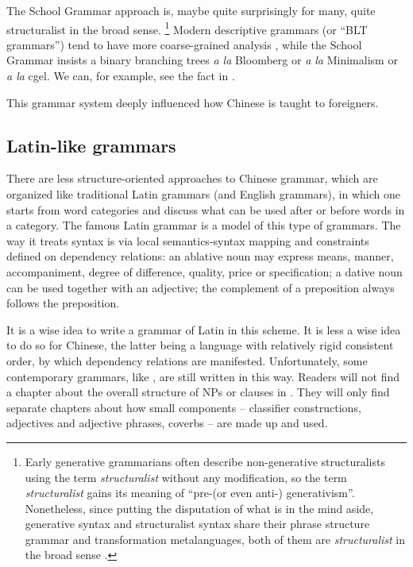 The School Grammar approach is, maybe quite surprisingly for many, quite structuralist in the broad 
sense.%
\footnote{
    Early generative grammarians often describe non-generative structuralists using the term \emph{structuralist}
    without any modification, so the term \emph{structuralist} gains its meaning of ``pre-(or even anti-)
    generativism''. Nonetheless, since putting the disputation of what is in the mind aside, 
    generative syntax and structuralist syntax share their phrase structure grammar and transformation 
    metalanguages, both of them are \emph{structuralist} in the broad sense \citep{newmeyer1986has}.
}
Modern descriptive grammars (or ``BLT grammars'') tend to have more coarse-grained analysis \citep{dryer2006descriptive},
while the School Grammar insists a binary branching trees \emph{a la} Bloomberg or \emph{a la} Minimalism
or \emph{a la} \ac{cgel}. We can, for example, see the fact in .

This grammar system deeply influenced how Chinese is taught to foreigners. %

\subsection{Latin-like grammars}

There are less structure-oriented approaches to Chinese grammar, which are organized like traditional 
Latin grammars (and English grammars), in which one starts from word categories and discuss what can be 
used after or before words in a category. The famous Latin grammar \citet{greenough2013allen} is 
a model of this type of grammars. The way it treats syntax is via local semantics-syntax mapping 
and constraints defined on dependency relations: an ablative noun may express means, manner, 
accompaniment, degree of difference, quality, price or specification; a dative noun can be used 
together with an adjective; the complement of a preposition always follows the preposition.

It is a wise idea to write a grammar of Latin in this scheme. It is less a wise idea to do so for Chinese,
the latter being a language with relatively rigid consistent order, by which dependency relations 
are manifested. Unfortunately, some contemporary grammars, like \citet{po2015chinese}, are still 
written in this way. Readers will not find a chapter about the overall structure of NPs or clauses 
in \citet{po2015chinese}. They will only find separate chapters about how small components -- classifier
constructions, adjectives and adjective phrases, coverbs -- are made up and used.

